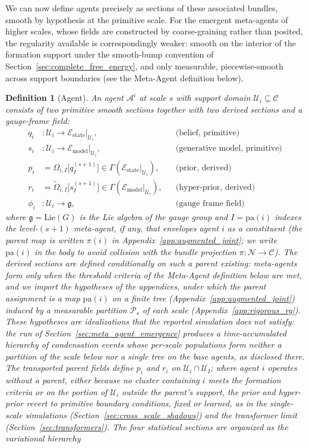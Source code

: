 \documentclass[11pt]{article}
\newtheorem{definition}{Definition}
\begin{document}
We can now define agents precisely as sections of these associated bundles, smooth by hypothesis at the primitive scale. For the emergent meta-agents of higher scales, whose fields are constructed by coarse-graining rather than posited, the regularity available is correspondingly weaker: smooth on the interior of the formation support under the smooth-bump convention of Section~\ref{sec:complete_free_energy}, and only measurable, piecewise-smooth across support boundaries (see the Meta-Agent definition below).

\begin{definition}[Agent]
An agent $\mathcal{A}^i$ at scale $s$ with support domain $\mathcal{U}_i \subseteq \mathcal{C}$ consists of two primitive smooth sections together with two derived sections and a gauge-frame field:
\begin{align}
q_i &: \mathcal{U}_i \to \mathcal{E}_{\mathrm{state}}|_{\mathcal{U}_i}, &&\text{(belief, primitive)} \\
s_i &: \mathcal{U}_i \to \mathcal{E}_{\mathrm{model}}|_{\mathcal{U}_i}, &&\text{(generative model, primitive)} \\
p_i &= \Omega_{i,I}\big[q_I^{(s+1)}\big] \in \Gamma\left(\mathcal{E}_{\mathrm{state}}|_{\mathcal{U}_i}\right), &&\text{(prior, derived)} \\
r_i &= \tilde\Omega_{i,I}\big[s_I^{(s+1)}\big] \in \Gamma\left(\mathcal{E}_{\mathrm{model}}|_{\mathcal{U}_i}\right), &&\text{(hyper-prior, derived)} \\
\phi_i &: \mathcal{U}_i \to \mathfrak{g}, &&\text{(gauge frame field)}
\end{align}
where $\mathfrak{g} = \mathrm{Lie}(G)$ is the Lie algebra of the gauge group and $I = \mathrm{pa}(i)$ indexes the level-$(s{+}1)$ meta-agent, if any, that envelopes agent $i$ as a constituent (the parent map is written $\pi(i)$ in Appendix~\ref{app:augmented_joint}; we write $\mathrm{pa}(i)$ in the body to avoid collision with the bundle projection $\pi: \mathcal{N} \to \mathcal{C}$). The derived sections are defined conditionally on such a parent existing: meta-agents form only when the threshold criteria of the Meta-Agent definition below are met, and we import the hypotheses of the appendices, under which the parent assignment is a map $\mathrm{pa}(i)$ on a finite tree (Appendix~\ref{app:augmented_joint}) induced by a measurable partition $\mathcal{P}_s$ of each scale (Appendix~\ref{app:rigorous_rg}). These hypotheses are idealizations that the reported simulation does not satisfy: the run of Section~\ref{sec:meta_agent_emergence} produces a time-accumulated hierarchy of condensation events whose per-scale populations form neither a partition of the scale below nor a single tree on the base agents, as disclosed there. The transported parent fields define $p_i$ and $r_i$ on $\mathcal{U}_i \cap \mathcal{U}_I$; where agent $i$ operates without a parent, either because no cluster containing $i$ meets the formation criteria or on the portion of $\mathcal{U}_i$ outside the parent's support, the prior and hyper-prior revert to primitive boundary conditions, fixed or learned, as in the single-scale simulations (Section~\ref{sec:cross_scale_shadows}) and the transformer limit (Section~\ref{sec:transformers}). The four statistical sections are organized as the variational hierarchy

\end{definition}
\end{document}
